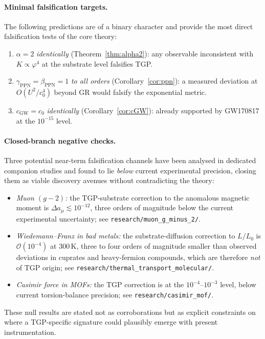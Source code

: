 \documentclass[11pt,a4paper]{article}
\begin{document}
\paragraph{Minimal falsification targets.} The following predictions are
of a binary character and provide the most direct falsification tests of
the core theory:
\begin{enumerate}[(F1),nosep]
  \item $\alpha=2$ \emph{identically} (Theorem~\ref{thm:alpha2}):
    any observable inconsistent with $K\propto\varphi^{4}$ at the
    substrate level falsifies TGP.
  \item $\gamma_{\mathrm{PPN}}=\beta_{\mathrm{PPN}}=1$ \emph{to all
    orders} (Corollary~\ref{cor:ppn}): a measured deviation at
    $O(U^{2}/c_{0}^{4})$ beyond GR would falsify the exponential metric.
  \item $c_{\mathrm{GW}}=c_{0}$ \emph{identically}
    (Corollary~\ref{cor:cGW}): already supported by GW170817 at the
    $10^{-15}$ level.
\end{enumerate}

\paragraph{Closed-branch negative checks.} Three potential near-term
falsification channels have been analysed in dedicated companion
studies and found to lie \emph{below} current experimental precision,
closing them as viable discovery avenues without contradicting the
theory:
\begin{itemize}[nosep]
  \item \emph{Muon $(g\!-\!2)$:} the TGP-substrate correction to the
    anomalous magnetic moment is $\Delta a_{\mu}\lesssim 10^{-12}$,
    three orders of magnitude below the current experimental
    uncertainty; see \texttt{research/muon\_g\_minus\_2/}.
  \item \emph{Wiedemann--Franz in bad metals:} the substrate-diffusion
    correction to $L/L_{0}$ is $\mathcal{O}(10^{-4})$ at $300$\,K, three
    to four orders of magnitude smaller than observed deviations in
    cuprates and heavy-fermion compounds, which are therefore \emph{not}
    of TGP origin; see \texttt{research/thermal\_transport\_molecular/}.
  \item \emph{Casimir force in MOFs:} the TGP correction is at the
    $10^{-4}$--$10^{-3}$ level, below current torsion-balance precision;
    see \texttt{research/casimir\_mof/}.
\end{itemize}
These null results are stated not as corroborations but as explicit
constraints on where a TGP-specific signature could plausibly emerge
with present instrumentation.
\end{document}
